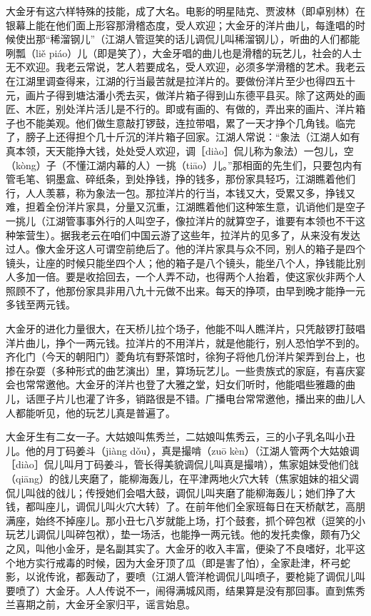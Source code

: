 \documentclass[12pt,UTF8]{ctexbook}
\begin{document}
大金牙有这六样特殊的技能，成了大名。电影的明星陆克、贾波林（即卓别林）在银幕上能在他们面上形容那滑稽态度，受人欢迎；大金牙的洋片曲儿，每逢唱的时候使出那“稀溜钢儿”（江湖人管逗笑的话儿调侃儿叫稀溜钢儿），听曲的人们都能咧瓢（liě piáo）儿（即是笑了），大金牙唱的曲儿也是滑稽的玩艺儿，社会的人士无不欢迎。我老云常说，艺人若要成名，受人欢迎，必须多学滑稽的艺术。我老云在江湖里调查得来，江湖的行当最苦就是拉洋片的。要做份洋片至少也得四五十元，画片子得到塘沽潘小秃去买，做洋片箱子得到山东德平县买。除了这两处的画匠、木匠，别处洋片活儿是不行的。即或有画的、有做的，弄出来的画片、洋片箱子也不能美观。他们做生意敲打锣鼓，连拉带唱，累了一天才挣个几角钱。临完了，膀子上还得担个几十斤沉的洋片箱子回家。江湖人常说：“象法（江湖人如有真本领，天天能挣大钱，处处受人欢迎，调［diào］侃儿称为象法）一包儿，空（kòng）子（不懂江湖内幕的人）一挑（tiāo）儿。”那相面的先生们，只要包内有管毛笔、铜墨盒、碎纸条，到处挣钱，挣的钱多，那份家具轻巧，江湖瞧着他们行，人人羡慕，称为象法一包。那拉洋片的行当，本钱又大，受累又多，挣钱又难，担着全份洋片家具，分量又沉重，江湖瞧着他们这种笨生意，讥诮他们是空子一挑儿（江湖管事事外行的人叫空子，像拉洋片的就算空子，谁要有本领也不干这种笨营生）。据我老云在咱们中国云游了这些年，拉洋片的见多了，从来没有发达过人。像大金牙这人可谓空前绝后了。他的洋片家具与众不同，别人的箱子是四个镜头，让座的时候只能坐四个人；他的箱子是八个镜头，能坐八个人，挣钱能比别人多加一倍。要是收拾回去，一个人弄不动，也得两个人抬着，使这家伙非两个人照顾不了，他那份家具非用八九十元做不出来。每天的挣项，由早到晚才能挣一元多钱至两元钱。

大金牙的进化力量很大，在天桥儿拉个场子，他能不叫人瞧洋片，只凭敲锣打鼓唱洋片曲儿，挣个一两元钱。拉洋片的不用洋片，就是他能行，别人恐怕学不到的。齐化门（今天的朝阳门）菱角坑有野茶馆时，徐狗子将他几份洋片架弄到台上，也掺在杂耍（多种形式的曲艺演出）里，算场玩艺儿。一些贵族式的家庭，有喜庆宴会也常常邀他。大金牙的洋片也登了大雅之堂，妇女们听时，他能唱些雅趣的曲儿，话匣子片儿也灌了许多，销路很是不错。广播电台常常邀他，播出来的曲儿人人都能听见，他的玩艺儿真是普遍了。

大金牙生有二女一子。大姑娘叫焦秀兰，二姑娘叫焦秀云，三的小子乳名叫小丑儿。他的月丁码姜斗（jiàng dǒu），真是撮啃（zuō kèn）（江湖人管两个大姑娘调［diào］侃儿叫月丁码姜斗，管长得美貌调侃儿叫真是撮啃），焦家姐妹受他们戗（qiāng）的戗儿夹磨了，能柳海轰儿，在平津两地火穴大转（焦家姐妹的祖父调侃儿叫戗的戗儿；传授她们会唱大鼓，调侃儿叫夹磨了能柳海轰儿；她们挣了大钱，都叫座儿，调侃儿叫火穴大转）了。在前年他们全家班每日在天桥献艺，高朋满座，始终不掉座儿。那小丑七八岁就能上场，打个鼓套，抓个碎包袱（逗笑的小玩艺儿调侃儿叫碎包袱），垫一场活，也能挣一两元钱。他的发托卖像，颇有乃父之风，叫他小金牙，是名副其实了。大金牙的收入丰富，便染了不良嗜好，北平这个地方实行戒毒的时候，因为大金牙顶了瓜（即是害了怕），全家赴津，杯弓蛇影，以讹传讹，都轰动了，要喷（江湖人管洋枪调侃儿叫喷子，要枪毙了调侃儿叫要喷了）大金牙。人人传说不一，闹得满城风雨，结果算是没有那回事。直到焦秀兰喜期之前，大金牙全家归平，谣言始息。
\end{document}
